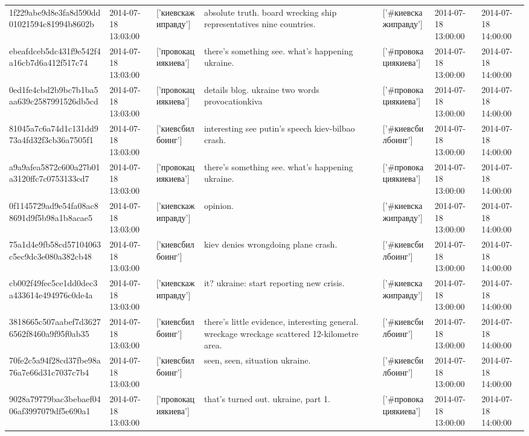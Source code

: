 \begin{tabular}{lllllll}
1f229abe9d8e3fa8d590dd01021594c81994b8602b & 2014-07-18 13:03:00 & ['киевскажиправду'] & absolute truth. board wrecking ship representatives nine countries. & ['#киевскажиправду'] & 2014-07-18 13:00:00 & 2014-07-18 14:00:00 \\
ebeafdceb5dc431f9e542f4a16cb7d6a412f517c74 & 2014-07-18 13:03:00 & ['провокациякиева'] & there's something see. what's happening ukraine. & ['#провокациякиева'] & 2014-07-18 13:00:00 & 2014-07-18 14:00:00 \\
0ed1fe4cbd2b9bc7b1ba5aa639c2587991526db5cd & 2014-07-18 13:03:00 & ['провокациякиева'] & details blog. ukraine two words provocationkiva & ['#провокациякиева'] & 2014-07-18 13:00:00 & 2014-07-18 14:00:00 \\
81045a7c6a74d1c131dd973a4fd32f3cb36a7505f1 & 2014-07-18 13:03:00 & ['киевсбилбоинг'] & interesting see putin's speech kiev-bilbao crash. & ['#киевсбилбоинг'] & 2014-07-18 13:00:00 & 2014-07-18 14:00:00 \\
a9a9afea5872c600a27b01a3120ffc7c0753133cd7 & 2014-07-18 13:03:00 & ['провокациякиева'] & there's something see. what's happening ukraine. & ['#провокациякиева'] & 2014-07-18 13:00:00 & 2014-07-18 14:00:00 \\
0f1145729ad9e54fa08ac88691d9f5b98a1b8acae5 & 2014-07-18 13:03:00 & ['киевскажиправду'] & opinion. & ['#киевскажиправду'] & 2014-07-18 13:00:00 & 2014-07-18 14:00:00 \\
75a1d4e9fb58cd57104063c5ec9dc3e080a382cb48 & 2014-07-18 13:03:00 & ['киевсбилбоинг'] & kiev denies wrongdoing plane crash. & ['#киевсбилбоинг'] & 2014-07-18 13:00:00 & 2014-07-18 14:00:00 \\
cb002f49fec5ce1dd0dec3a433614e494976c0de4a & 2014-07-18 13:03:00 & ['киевскажиправду'] & it? ukraine: start reporting new crisis. & ['#киевскажиправду'] & 2014-07-18 13:00:00 & 2014-07-18 14:00:00 \\
3818665c507aabef7d36276562f8460a9f95f0ab35 & 2014-07-18 13:03:00 & ['киевсбилбоинг'] & there's little evidence, interesting general. wreckage wreckage scattered 12-kilometre area. & ['#киевсбилбоинг'] & 2014-07-18 13:00:00 & 2014-07-18 14:00:00 \\
70fe2c5a94f28cd37fbe98a76a7e66d31c7037c7b4 & 2014-07-18 13:03:00 & ['киевсбилбоинг'] & seen, seen, situation ukraine. & ['#киевсбилбоинг'] & 2014-07-18 13:00:00 & 2014-07-18 14:00:00 \\
9028a79779bac3bebaef0406af3997079df5e690a1 & 2014-07-18 13:03:00 & ['провокациякиева'] & that's turned out. ukraine, part 1. & ['#провокациякиева'] & 2014-07-18 13:00:00 & 2014-07-18 14:00:00 \\

\end{tabular}
